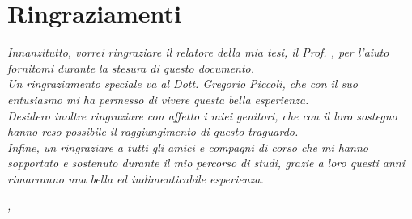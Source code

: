 
\cleardoublepage
{}
{}




\begingroup
\let\clearpage\relax
\let\cleardoublepage\relax
\let\cleardoublepage\relax

\chapter*{Ringraziamenti}

\noindent \textit{Innanzitutto, vorrei ringraziare il relatore della mia tesi, il Prof. \myProf, per l'aiuto fornitomi durante la stesura di questo documento.}\\

\noindent \textit{Un ringraziamento speciale va al Dott. Gregorio Piccoli, che con il suo entusiasmo mi ha permesso di vivere questa bella esperienza.}\\

\noindent \textit{Desidero inoltre ringraziare con affetto i miei genitori, che con il loro sostegno hanno reso possibile il raggiungimento di questo traguardo.}\\

\noindent \textit{Infine, un ringraziare a tutti gli amici e compagni di corso che mi hanno sopportato e sostenuto durante il mio percorso di studi, grazie a loro questi anni rimarranno una bella ed indimenticabile esperienza.}\\

\bigskip

\noindent\textit{\myLocation, \myTime}
\hfill \myName

\endgroup

